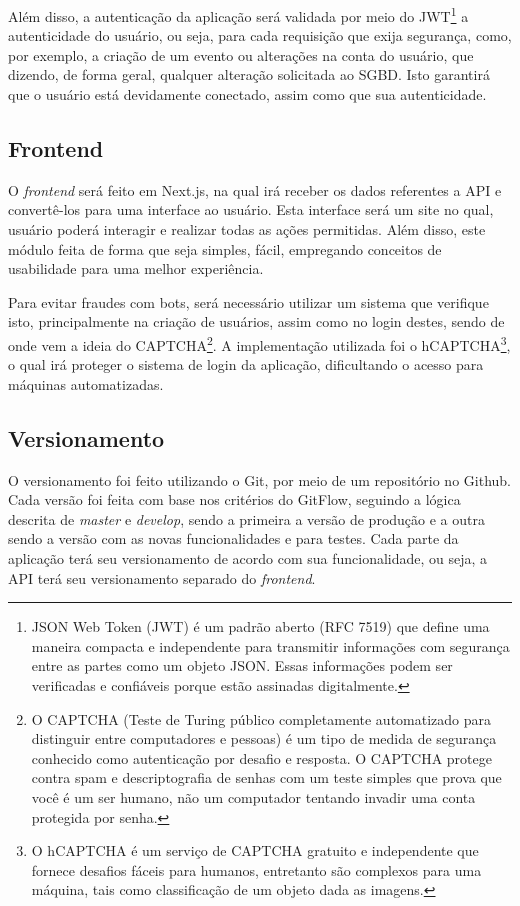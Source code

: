 Além disso, a autenticação da aplicação será validada por meio do JWT\footnote{JSON Web Token (JWT) é um padrão aberto (RFC 7519) que define uma maneira compacta e independente para transmitir informações com segurança entre as partes como um objeto JSON. Essas informações podem ser verificadas e confiáveis porque estão assinadas digitalmente.} a autenticidade do usuário, ou seja, para cada requisição que exija segurança, como, por exemplo, a criação de um evento ou alterações na conta do usuário, que dizendo, de forma geral, qualquer alteração solicitada ao SGBD. Isto garantirá que o usuário está devidamente conectado, assim como que sua autenticidade.

\subsection{Frontend}
O \textit{frontend} será feito em Next.js, na qual irá receber os dados referentes a API e convertê-los para uma interface ao usuário. Esta interface será um site no qual, usuário poderá interagir e realizar todas as ações permitidas. Além disso, este módulo feita de forma que seja simples, fácil, empregando conceitos de usabilidade para uma melhor experiência.

Para evitar fraudes com bots, será necessário utilizar um sistema que verifique isto, principalmente na criação de usuários, assim como no login destes, sendo de onde vem a ideia do CAPTCHA\footnote{O CAPTCHA (Teste de Turing público completamente automatizado para distinguir entre computadores e pessoas) é um tipo de medida de segurança conhecido como autenticação por desafio e resposta. O CAPTCHA protege contra spam e descriptografia de senhas com um teste simples que prova que você é um ser humano, não um computador tentando invadir uma conta protegida por senha.}. A implementação utilizada foi o hCAPTCHA\footnote{O hCAPTCHA é um serviço de CAPTCHA gratuito e independente que fornece desafios fáceis para humanos, entretanto são complexos para uma máquina, tais como classificação de um objeto dada as imagens.}, o qual irá proteger o sistema de login da aplicação, dificultando o acesso para máquinas automatizadas.

\subsection{Versionamento}
O versionamento foi feito utilizando o Git, por meio de um repositório no Github. Cada versão foi feita com base nos critérios do GitFlow, seguindo a lógica descrita de \textit{master} e \textit{develop}, sendo a primeira a versão de produção e a outra sendo a versão com as novas funcionalidades e para testes. Cada parte da aplicação terá seu versionamento de acordo com sua funcionalidade, ou seja, a API terá seu versionamento separado do \textit{frontend}.